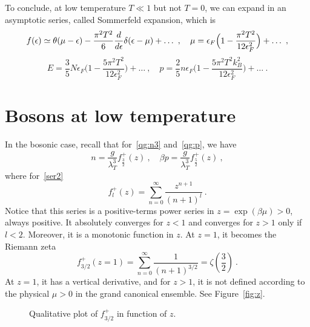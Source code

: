     To conclude, at low temperature $T \ll 1$ but not $T=0$, we can expand in an asymptotic series, called Sommerfeld expansion, which is 
    \begin{equation*}
        f(\epsilon) \simeq \theta (\mu - \epsilon) - \frac{\pi^2 T^2}{6} \frac{d}{d\epsilon} \delta (\epsilon - \mu) + \ldots ~, \quad \mu = \epsilon_F \Big (1 - \frac{\pi^2 T^2}{12 \epsilon_F^2} \Big ) + \ldots ~,
    \end{equation*}
    \begin{equation*}
        E = \frac{3}{5} N \epsilon_F \Big (1 - \frac{5 \pi^2 T^2}{12 \epsilon_F^2} \Big ) + \ldots ~, \quad p = \frac{2}{5} n \epsilon_F \Big (1 - \frac{5 \pi^2 T^2 k_B^2}{12 \epsilon_F^2} \Big ) + \ldots ~.
    \end{equation*}

\section{Bosons at low temperature}

    In the bosonic case, recall that for~\eqref{qg:n3} and~\eqref{qg:p}, we have
    \begin{equation*}
        n = \frac{g}{\lambda_T^3} f_{\frac{3}{2}}^+ (z) ~, \quad \beta p = \frac{g}{\lambda_T^3} f_{\frac{5}{2}}^+ (z) ~,
    \end{equation*}
    where for~\eqref{ser2}
    \begin{equation*}
        f_l^+ (z) = \sum_{n=0}^\infty \frac{z^{n+1}}{(n+1)^l} ~.
    \end{equation*}
    Notice that this series is a positive-terms power series in $z = \exp(\beta\mu) > 0$, always positive. It absolutely converges for $z < 1$ and converges for $z > 1$ only if $l < 2$. Moreover, it is a monotonic function in $z$. At $z = 1$, it becomes the Riemann zeta 
    \begin{equation*}
        f^+_{3/2} (z=1) = \sum_{n=0}^\infty \frac{1}{(n+1)^{3/2}} = \zeta(\frac{3}{2}) ~.
    \end{equation*}
    At $z = 1$, it has a vertical derivative, and for $z > 1$, it is not defined according to the physical $\mu > 0$ in the grand canonical ensemble. See Figure~\eqref{fig:z}.
    \begin{figure}[h!]
        \centering
        \caption{Qualitative plot of $f^+_{3/2}$ in function of $z$.}
        \label{fig:z}
    \end{figure}

